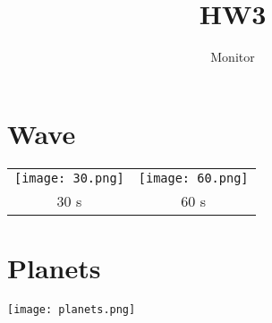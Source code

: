 \documentclass[]{article}
\title{HW3}
\author{Monitor}
\begin{document}
    \section{Wave}
        \begin{table}[h]
            \centering
            \begin{tabular}{cc}
                \texttt{[image: 30.png]} & \texttt{[image: 60.png]} \\
                30 s & 60 s\\
            \end{tabular}
        \end{table}
    \section{Planets}
        \texttt{[image: planets.png]}
\end{document}
